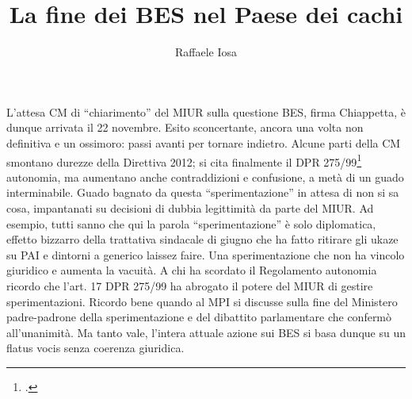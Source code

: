 \author{Raffaele Iosa}
\title{La fine dei BES nel Paese dei cachi}
\label{cha:Iosa281113}
\maketitle
{}

L'attesa CM di “chiarimento” del MIUR sulla questione BES, firma  Chiappetta, è dunque arrivata il 22 novembre. Esito sconcertante, ancora una volta non definitiva e  un ossimoro: passi avanti per tornare indietro. Alcune parti della CM smontano durezze della Direttiva 2012; si cita finalmente il DPR 275/99\footcite{DPR_275_1999} autonomia, ma aumentano  anche contraddizioni e confusione,  a metà di un guado  interminabile. Guado bagnato  da questa  “sperimentazione”  in attesa di non si sa cosa, impantanati  su decisioni di dubbia legittimità da parte del MIUR. Ad esempio, tutti sanno che qui la parola “sperimentazione” è solo diplomatica, effetto bizzarro della trattativa sindacale di giugno che ha fatto ritirare gli ukaze su PAI e dintorni a generico laissez faire. Una sperimentazione che non ha vincolo giuridico e aumenta la vacuità. A chi ha scordato il Regolamento autonomia ricordo che l'art. 17  DPR 275/99 ha abrogato il potere del MIUR di gestire sperimentazioni. Ricordo bene quando al MPI si discusse sulla fine del Ministero padre-padrone della sperimentazione e del dibattito parlamentare che confermò  all'unanimità.  Ma tanto vale, l'intera attuale azione sui BES si basa dunque su un flatus vocis senza coerenza giuridica.

